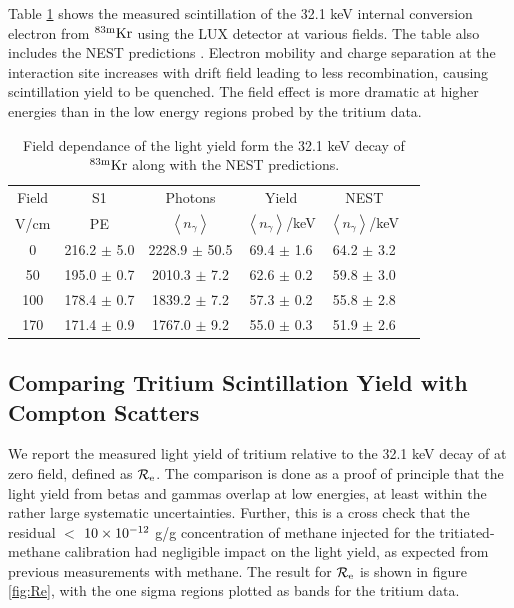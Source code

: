Table \ref{table:kr32} shows the measured scintillation of the 32.1 keV internal conversion electron from $\rm ^{83m}Kr$ using the LUX detector at various fields. The table also includes the NEST predictions \cite{NEST_2013}. Electron mobility and charge separation at the interaction site increases with drift field leading to less recombination, causing scintillation yield to be quenched. The field effect is more dramatic at higher energies than in the low energy regions probed by the tritium data.

\renewcommand{\baselinestretch}{1}
\small\normalsize
\begin{table}[h!]
\begin{center}
\begin{tabular}{|c|c|c|c|c|c|}
\hline
Field	&S1			& Photons						& Yield 								&NEST	 \\
V/cm	& PE					& $\left<n_{\gamma}\right>$		& $\left<n_{\gamma}\right>$/keV	& $\left<n_{\gamma}\right>$/keV \\ \hline
0 		&	216.2 $\pm$ 5.0 	&2228.9 $\pm$ 50.5 &	69.4 $\pm$	1.6 	&	64.2 $\pm$ 3.2  \\ \hline
50 		&	195.0 $\pm$ 0.7 	&2010.3 $\pm$ 7.2   & 	62.6 $\pm$	0.2	&	59.8 $\pm$ 3.0 \\ \hline
100 	&	178.4 $\pm$ 0.7 	&1839.2 $\pm$ 	7.2	 &	57.3 $\pm$ 0.2 	&	55.8 $\pm$ 2.8 \\ \hline
170 	&  171.4 $\pm$ 0.9		&1767.0 $\pm$ 	9.2  &	55.0 $\pm$ 0.3 	&	51.9 $\pm$ 2.6 \\ \hline
\end{tabular}
\caption{Field dependance of the light yield form the 32.1 keV decay of $\rm^{83m}Kr$ along with the NEST \cite{NEST_2013} predictions.}
\label{table:kr32}
\end{center}
\end{table}
\renewcommand{\baselinestretch}{2}
\small\normalsize


\subsection{Comparing Tritium Scintillation Yield with Compton Scatters}

We report the measured light yield of tritium relative to the 32.1 keV decay of \KrCal at zero field, defined as $\rm \mathcal{R}_e$. The comparison is done as a proof of principle that the light yield from betas and gammas overlap at low energies, at least within the rather large systematic uncertainties. Further, this is a cross check that the residual $<$ $\rm10\times10^{-12}$ g/g concentration of methane injected for the tritiated-methane calibration had negligible impact on the light yield, as expected from previous measurements with methane\cite{Kirill_Methane}. The result for $\rm \mathcal{R}_e$ is shown in figure \ref{fig:Re}, with the one sigma regions plotted as bands for the tritium data.

